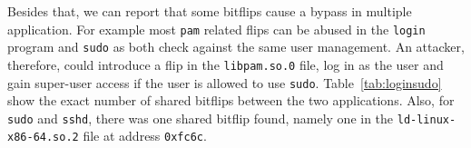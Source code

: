 Besides that, we can report that some bitflips cause a bypass in multiple
application. For example most \texttt{pam} related flips can be abused in the
\texttt{login} program and \texttt{sudo} as both check against the same user
management. An attacker, therefore, could introduce a flip in the
\texttt{libpam.so.0} file, log in as the user and gain super-user access if the
user is allowed to use \texttt{sudo}. Table~\ref{tab:loginsudo} show the exact
number of shared bitflips between the two applications. Also, for \texttt{sudo}
and \texttt{sshd}, there was one shared bitflip found, namely one in the
\texttt{ld-linux-x86-64.so.2} file at address \texttt{0xfc6c}.

